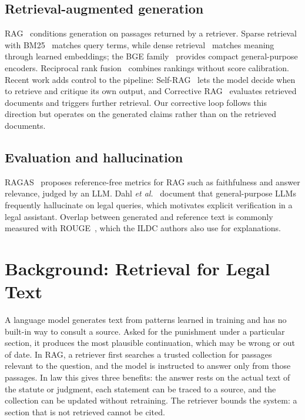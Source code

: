 \documentclass[conference]{IEEEtran}
\begin{document}
\subsection{Retrieval-augmented generation}
RAG~\cite{lewis2020} conditions generation on passages returned by a retriever. Sparse retrieval with BM25~\cite{robertson2009} matches query terms, while dense retrieval~\cite{karpukhin2020,reimers2019} matches meaning through learned embeddings; the BGE family~\cite{xiao2023} provides compact general-purpose encoders. Reciprocal rank fusion~\cite{cormack2009} combines rankings without score calibration. Recent work adds control to the pipeline: Self-RAG~\cite{asai2024} lets the model decide when to retrieve and critique its own output, and Corrective RAG~\cite{yan2024} evaluates retrieved documents and triggers further retrieval. Our corrective loop follows this direction but operates on the generated claims rather than on the retrieved documents.

\subsection{Evaluation and hallucination}
RAGAS~\cite{es2023} proposes reference-free metrics for RAG such as faithfulness and answer relevance, judged by an LLM. Dahl \emph{et al.}~\cite{dahl2024} document that general-purpose LLMs frequently hallucinate on legal queries, which motivates explicit verification in a legal assistant. Overlap between generated and reference text is commonly measured with ROUGE~\cite{lin2004}, which the ILDC authors also use for explanations.

\section{Background: Retrieval for Legal Text}
\label{sec:background}
A language model generates text from patterns learned in training and has no built-in way to consult a source. Asked for the punishment under a particular section, it produces the most plausible continuation, which may be wrong or out of date. In RAG, a retriever first searches a trusted collection for passages relevant to the question, and the model is instructed to answer only from those passages. In law this gives three benefits: the answer rests on the actual text of the statute or judgment, each statement can be traced to a source, and the collection can be updated without retraining. The retriever bounds the system: a section that is not retrieved cannot be cited.
\end{document}
